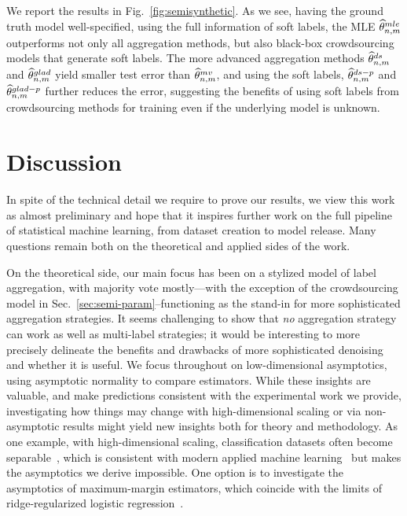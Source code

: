 \documentclass[11pt]{article}
\newcommand{\what}[1]{\widehat{#1}}
\newcommand{\mv}{^{\textup{mv}}}
\newcommand{\ds}{^{\textsc{ds}}}
\newcommand{\dsp}{^{\textsc{ds-p}}}
\newcommand{\glad}{^{\textsc{glad}}}
\newcommand{\gladp}{^{\textsc{glad-p}}}
\newcommand{\<}{\langle} %
\renewcommand{\>}{\rangle}
\newcommand{\mve}{\what{\theta}\mv_{n,m}} %
\newcommand{\dse}{\what{\theta}\ds_{n,m}} %
\newcommand{\dspe}{\what{\theta}\dsp_{n,m}} %
\newcommand{\glade}{\what{\theta}\glad_{n,m}} %
\newcommand{\gladpe}{\what{\theta}\gladp_{n,m}} %
\begin{document}
We report the results in Fig.~\ref{fig:semisynthetic}. As we see, having the
ground truth model well-specified, using the full information of soft
labels, the MLE $\what{\theta}^{\textup{mle}}_{n,m}$ outperforms not only
all aggregation methods, but also black-box crowdsourcing models that
generate soft labels. The more advanced aggregation methods $\dse$ and
$\glade$ yield smaller test error than $\mve$, and using the soft labels,
$\dspe$ and $\gladpe$ further reduces the error, suggesting the benefits
of using soft labels from crowdsourcing methods for training even if the
underlying model is unknown.

\FloatBarrier
\section{Discussion}

In spite of the technical detail we require to prove our results,
we view this work as almost preliminary and hope that it inspires further
work on the full pipeline of statistical machine learning,
from dataset creation to model release. Many questions remain
both on the theoretical and applied sides of the work.

On the theoretical side, our main focus has been on a stylized model of
label aggregation, with majority vote mostly---with the exception of the
crowdsourcing model in Sec.~\ref{sec:semi-param}--functioning as the
stand-in for more sophisticated aggregation strategies. It seems challenging
to show that \emph{no} aggregation strategy can work as well as multi-label
strategies; it would be interesting to more precisely delineate the benefits
and drawbacks of more sophisticated denoising and whether it is useful.  We
focus throughout on low-dimensional asymptotics, using asymptotic normality
to compare estimators. While these insights are valuable, and make
predictions consistent with the experimental work we provide, investigating
how things may change with high-dimensional scaling or via non-asymptotic
results might yield new insights both for theory and methodology. As one
example, with high-dimensional scaling, classification datasets often become
separable~\cite{CandesSu19pnas, CandesSu19}, which is consistent with modern
applied machine learning~\cite{ZhangBeHaReVi21} but makes the asymptotics we
derive impossible. One option
is to investigate the asymptotics of maximum-margin estimators,
which coincide with the limits of ridge-regularized logistic
regression~\cite{RossetZhHa04, SoudryHoNaGuSr18}.
\end{document}
